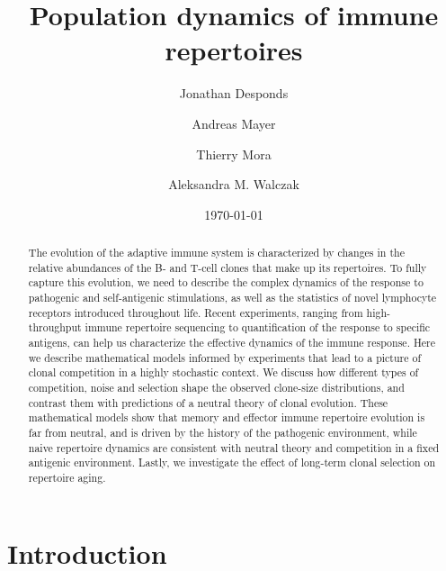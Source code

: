 \documentclass[aps,pre,twocolumn,superscriptaddress,groupedaddress]{revtex4}
\newcommand{\<}{\langle}
\renewcommand{\>}{\rangle}
\begin{document}
\title{Population dynamics of immune repertoires}

\author{Jonathan Desponds}
\author{Andreas Mayer}
\author{Thierry Mora}
\author{Aleksandra M. Walczak}

\date{\today}
\linespread{1}

\begin{abstract}
The evolution of the adaptive immune system is characterized by changes in the relative abundances of the B- and T-cell clones that make up its repertoires. To fully capture this evolution, we need to describe the complex dynamics of the response to pathogenic and self-antigenic stimulations, as well as the statistics of novel lymphocyte receptors introduced throughout life. Recent experiments, ranging from high-throughput immune repertoire sequencing to quantification of the response to specific antigens, can help us characterize the effective dynamics of the immune response. Here we describe mathematical models informed by experiments that lead to a picture of clonal competition in a highly stochastic context. We discuss how different types of competition, noise and selection shape the observed clone-size distributions, and contrast them with predictions of a neutral theory of clonal evolution. These mathematical models show that memory and effector immune repertoire evolution is far from neutral, and is driven by the history of the pathogenic environment, while naive repertoire dynamics are consistent with neutral theory and competition in a fixed antigenic environment. Lastly, we investigate the effect of long-term clonal selection on repertoire aging. 
\end{abstract}

\maketitle
 \section{Introduction}
 \label{secintro}
 
\end{document}
